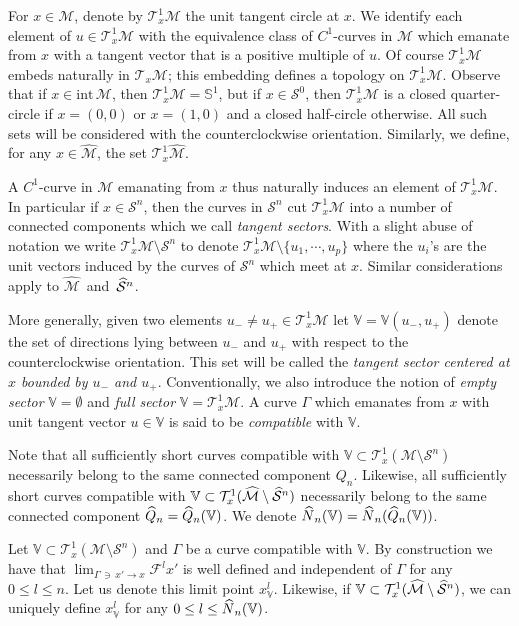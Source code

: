 \documentclass[AHL, Unicode, longabstracts,published]{cedram}
\newcommand{\intr}[1]{\mathrm{int}\,#1}
\newcommand{\hhs}{\mathbb{S}}
\newcommand{\tang}{\mathcal{T}}
\newcommand{\tangu}{\mathcal{T}^1}
\newcommand{\cm}{\mathcal{F}}
\newcommand{\csp}{\mathcal{M}}
\newcommand{\cspi}{\widehat{\csp}}
\newcommand{\singPrivate}{\mathcal{S}}
\newcommand{\sing}[1]{\singPrivate^{#1}}
\newcommand{\singp}[1]{\hat{\singPrivate}^{#1}}
\newcommand{\Np}{\hat N}
\newcommand{\cV}{\mathbb{V}}
\let\oldhat\hat
\renewcommand*{\hat}[1]{\mathchoice{\widehat{#1}}{\widehat{#1}}{\oldhat{#1}}{\oldhat{#1}}}
\begin{document}
For $x\in\csp$, denote by $\tangu_x\csp$ the unit tangent circle at $x$. We identify each element of $u\in\tangu_{x}\csp$ with the equivalence class of $C^1$-curves in $\csp$ which emanate from $x$ with a tangent vector that is a positive multiple of $u$. Of course $\tangu_x\csp$ embeds naturally in $\tang_x\csp$; this embedding defines a topology on $\tangu_x\csp$. Observe that if $x\in\intr\csp$, then $\tangu_x\csp = \hhs^1$, but if $x\in\sing0$, then $\tangu_x\csp$ is a closed quarter-circle if $x = (0,0)$ or $x = (1,0)$ and a closed half-circle otherwise. All such sets will be considered with the counterclockwise orientation. Similarly, we define, for any $x\in\cspi$, the set $\tangu_x\cspi$.

A $C^1$-curve in $\csp$ emanating from $x$ thus naturally induces an element of $\tangu_x\csp$. In particular if $x\in\sing n$, then the curves in $\sing n$ cut $\tangu_x\csp$ into a number of connected components which we call \emph{tangent sectors}. With a slight abuse of notation we write $\tangu_x\csp\setminus\sing n$ to denote $\tangu_{x}\csp\setminus\{u_1,\cdots,u_{p}\}$ where the $u_i$'s are the unit vectors induced by the curves of $\sing{n}$ which meet at $x$. Similar considerations apply to $\cspi$~and~$\singp n$.

More generally, given two elements $u_-\!\!\ne \!\!u_+\in\tangu_x\csp$ let $\cV=\cV(u_-, u_+)$ denote the set of directions lying between $u_-$ and $u_+$ with respect to the counterclockwise orientation. This set will be called the \emph{tangent sector centered at $x$ bounded by $u_-$ and $u_+$}. Conventionally, we also introduce the notion of \emph{empty sector} $\cV = \emptyset$ and \emph{full sector} $\cV = \tangu_{x}\csp$. A curve $\Gamma$ which emanates from $x$ with unit tangent vector $u\in\cV$ is said to be \emph{compatible} with $\cV$.

\noindent Note that all sufficiently short curves compatible with $\cV\subset\tangu_{x}(\csp\setminus\sing n)$ necessarily belong to the same connected component $Q_n$. Likewise, all sufficiently short curves compatible with $\cV\subset\tangu_{x}(\cspi\setminus\singp n)$ necessarily belong to the same connected component $\hat Q_n = \hat Q_n(\cV)$. We denote $\Np_n(\cV) = \Np_n(\hat Q_n(\cV))$.

Let $\cV\subset\tangu_{x}(\csp\setminus\sing n)$ and $\Gamma$ be a curve compatible with $\cV$. By construction we have that $\lim_{\Gamma\,\ni\,x'\to x}\cm^l x'$ is well defined and independent of $\Gamma$ for any $0\le l\le n$. Let us denote this limit point $x^l_\cV$. Likewise, if $\cV\subset\tangu_{x}(\cspi\setminus\singp n)$, we can uniquely define $x^{l}_{\cV}$ for any $0\le l\le \Np_n(\cV)$.
\end{document}
